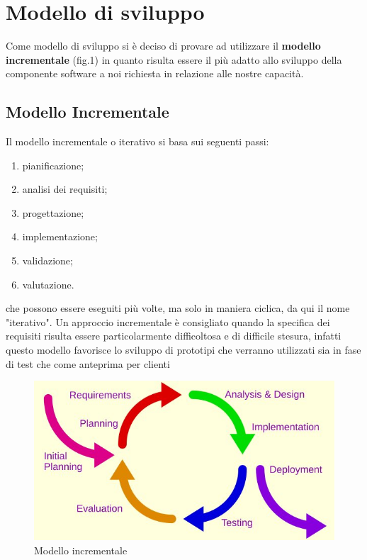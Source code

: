 \section{Modello di sviluppo}
	Come modello di sviluppo si è deciso di provare ad utilizzare il \textbf{modello incrementale} (fig.1) in quanto risulta essere il più adatto allo sviluppo della componente software a noi richiesta in relazione alle nostre capacità. 
	
	\subsection{Modello Incrementale}
		Il modello incrementale o iterativo si basa sui seguenti passi:
		\begin{enumerate}
			\item pianificazione;
			\item analisi dei requisiti\pedice;
			\item progettazione;
			\item implementazione;
			\item validazione;
			\item valutazione.
		\end{enumerate}
		che possono essere eseguiti più volte, ma solo in maniera ciclica, da qui il nome "iterativo". Un approccio incrementale è consigliato quando la specifica dei requisiti risulta essere particolarmente difficoltosa e di difficile stesura, infatti questo modello favorisce lo sviluppo di prototipi che verranno utilizzati sia in fase di test che come anteprima per clienti

		\begin{figure}[!htpb]
			\centering
		    \includegraphics[scale= 0.9]{Iterative_development_model.jpg}
			\caption{Modello incrementale}
		\end{figure}
